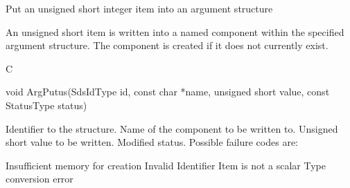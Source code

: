 \begin{manroutinedescription}
      Put an unsigned short integer item into an argument structure

      An unsigned short item is written into a named component within the
      specified argument structure. The component is created if it
      does not currently exist.
 
      C

      void ArgPutus(SdsIdType id, const char *name, unsigned short value, %
const StatusType {\mantt{*}} status)
 
\begin{manparametertable}
 Identifier to the structure.
 Name of the component to be %
written to.
 Unsigned short value to %
be written.
 Modified status. Possible %
failure codes are:
\end{manparametertable}
\begin{mantwocolumntable}
Insufficient memory for creation
Invalid Identifier
Item is not a scalar
Type conversion error
\end{mantwocolumntable}
\end{manroutinedescription}
